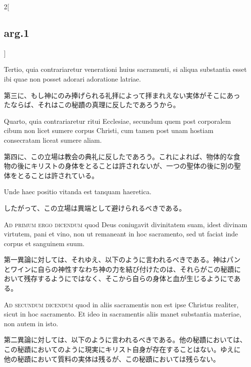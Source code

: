 \documentclass[paper=a4paper,fontsize=10pt,jafontsize=9pt,titlepage]{jlreq}
\begin{document}
\begin{paracol}{2}[\subsection{arg.1}]
\switchcolumn*

Tertio, quia contrariaretur venerationi huius sacramenti, si aliqua
substantia esset ibi quae non posset adorari adoratione latriae.

\switchcolumn

第三に、もし神にのみ捧げられる礼拝によって拝まれえない実体がそこにあっ
たならば、それはこの秘蹟の真理に反したであろうから。

\switchcolumn*

Quarto, quia contrariaretur ritui Ecclesiae, secundum quem post
corporalem cibum non licet sumere corpus Christi, cum tamen post unam
hostiam consecratam liceat sumere aliam.

\switchcolumn

第四に、この立場は教会の典礼に反したであろう。これによれば、物体的な食
物の後にキリストの身体をとることは許されないが、一つの聖体の後に別の聖
体をとることは許されている。

\switchcolumn*

Unde haec positio vitanda est tanquam haeretica.

\switchcolumn

したがって、この立場は異端として避けられるべきである。

\switchcolumn*[\subsection{ad.1}]

{\scshape Ad primum ergo dicendum} quod Deus coniugavit divinitatem
suam, idest divinam virtutem, pani et vino, non ut remaneant in hoc
sacramento, sed ut faciat inde corpus et sanguinem suum.

\switchcolumn

第一異論に対しては、それゆえ、以下のように言われるべきである。神はパン
とワインに自らの神性すなわち神の力を結び付けたのは、それらがこの秘蹟に
おいて残存するようにではなく、そこから自らの身体と血が生じるようにであ
る。

\switchcolumn*[\subsection{ad.2}]

{\scshape Ad secundum dicendum} quod in aliis sacramentis non est ipse
Christus realiter, sicut in hoc sacramento. Et ideo in sacramentis
aliis manet substantia materiae, non autem in isto.

\switchcolumn

第二異論に対しては、以下のように言われるべきである。他の秘蹟においては、
この秘蹟においてのように現実にキリスト自身が存在することはない。ゆえに
他の秘蹟において質料の実体は残るが、この秘蹟においては残らない。


\end{paracol}
\end{document}
